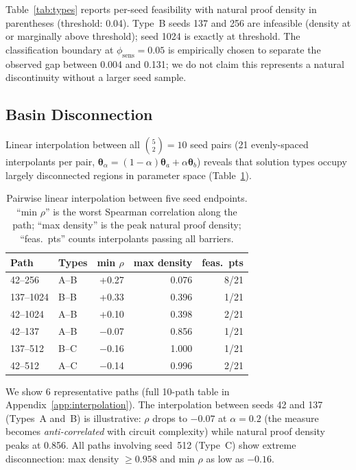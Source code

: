 \documentclass[twoside,11pt]{article}
\newcommand{\btheta}{\boldsymbol{\theta}}
\begin{document}
Table~\ref{tab:types} reports per-seed feasibility with natural proof density in
parentheses (threshold: 0.04). Type~B seeds 137 and 256 are infeasible (density
at or marginally above threshold); seed 1024 is exactly at threshold. The
classification boundary at $\phi_{\text{sens}} = 0.05$ is empirically chosen to
separate the observed gap between 0.004 and 0.131; we do not claim this represents
a natural discontinuity without a larger seed sample.

\subsection{Basin Disconnection}

Linear interpolation between all $\binom{5}{2} = 10$ seed pairs
(21 evenly-spaced interpolants per pair, $\btheta_\alpha = (1-\alpha)\btheta_a
+ \alpha\btheta_b$) reveals that solution types occupy largely disconnected
regions in parameter space (Table~\ref{tab:interpolation}).

\begin{table}[t]
\caption{Pairwise linear interpolation between five seed endpoints.
``min $\rho$'' is the worst Spearman correlation along the path; ``max density''
is the peak natural proof density; ``feas.\ pts'' counts interpolants
passing all barriers.}
\label{tab:interpolation}
\centering
\begin{tabular}{llrrr}
\toprule
Path & Types & min $\rho$ & max density & feas.\ pts \\
\midrule
42--256 & A--B & +0.27 & 0.076 & 8/21 \\
137--1024 & B--B & +0.33 & 0.396 & 1/21 \\
42--1024 & A--B & +0.10 & 0.398 & 2/21 \\
42--137 & A--B & $-$0.07 & 0.856 & 1/21 \\
137--512 & B--C & $-$0.16 & 1.000 & 1/21 \\
42--512 & A--C & $-$0.14 & 0.996 & 2/21 \\
\bottomrule
\end{tabular}
\end{table}

We show 6 representative paths (full 10-path table in Appendix~\ref{app:interpolation}).
The interpolation between seeds 42 and 137 (Types~A and~B) is illustrative:
$\rho$ drops to $-0.07$ at $\alpha = 0.2$ (the measure becomes
\emph{anti-correlated} with circuit complexity) while natural proof density peaks
at 0.856. All paths involving seed~512 (Type~C) show extreme disconnection:
max density $\geq 0.958$ and min $\rho$ as low as $-0.16$.
\end{document}
